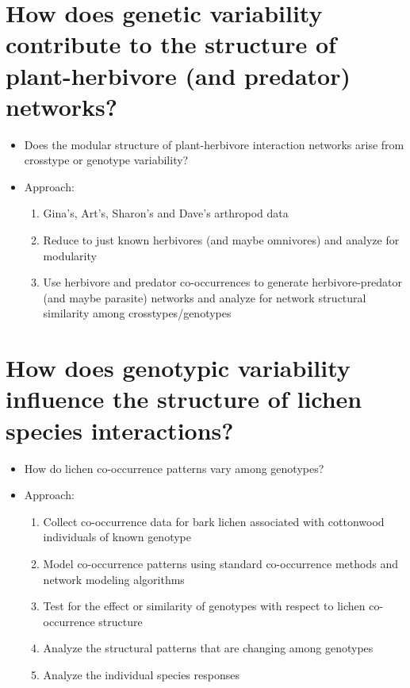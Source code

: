 \documentclass[12pt]{article}
\begin{document}
\section{How does genetic variability contribute to the structure of
  plant-herbivore (and predator) networks?}
\begin{itemize}
\item Does the modular structure of plant-herbivore interaction
  networks arise from crosstype or genotype variability?
\item Approach:
  \begin{enumerate}
  \item Gina's, Art's, Sharon's and Dave's arthropod data
  \item Reduce to just known herbivores (and maybe omnivores) and
    analyze for modularity
  \item Use herbivore and predator co-occurrences to generate
    herbivore-predator (and maybe parasite) networks and analyze for
    network structural similarity among crosstypes/genotypes
  \end{enumerate}
\end{itemize}

\section{How does genotypic variability influence the structure of
  lichen species interactions?}
\begin{itemize}
\item How do lichen co-occurrence patterns vary among genotypes?
\item Approach:
  \begin{enumerate}
  \item Collect co-occurrence data for bark lichen associated with
    cottonwood individuals of known genotype
  \item Model co-occurrence patterns using standard co-occurrence
    methods and network modeling algorithms
  \item Test for the effect or similarity of genotypes with respect to
    lichen co-occurrence structure
  \item Analyze the structural patterns that are changing among
    genotypes
  \item Analyze the individual species responses
  \end{enumerate}
\end{itemize}
\end{document}
